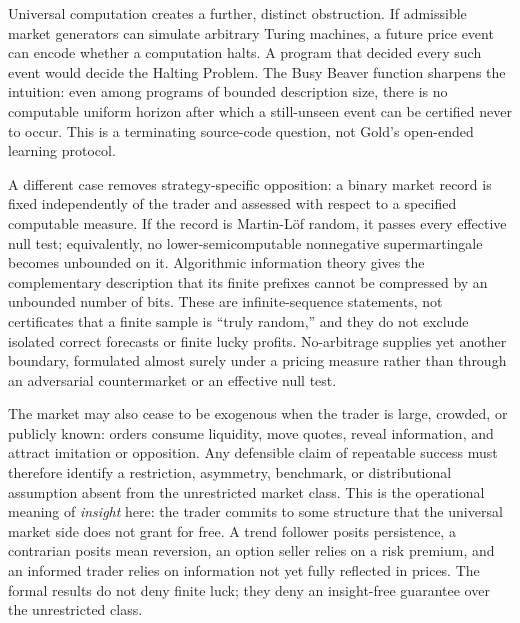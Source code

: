 \documentclass[aps,pra,reprint,superscriptaddress,amsmath,amssymb,floatfix]{revtex4-2}
\theoremstyle{plain}
\theoremstyle{definition}
\theoremstyle{remark}
\begin{document}
Universal computation creates a further, distinct obstruction. If admissible
market generators can simulate arbitrary Turing machines, a future price event
can encode whether a computation halts. A program that decided every such
event would decide the Halting Problem. The Busy Beaver function sharpens the
intuition: even among programs of bounded description size, there is no
computable uniform horizon after which a still-unseen event can be certified
never to occur. This is a terminating source-code question, not Gold's
open-ended learning protocol.

A different case removes strategy-specific opposition: a binary market record
is fixed independently of the trader and assessed with respect to a specified
computable measure. If the record is Martin-L\"of random, it passes every
effective null test; equivalently, no lower-semicomputable nonnegative
supermartingale becomes unbounded on it. Algorithmic information theory gives
the complementary description that its finite prefixes cannot be compressed
by an unbounded number of bits. These are infinite-sequence statements, not
certificates that a finite sample is ``truly random,'' and they do not exclude
isolated correct forecasts or finite lucky profits. No-arbitrage supplies yet
another boundary, formulated almost surely under a pricing measure rather than
through an adversarial countermarket or an effective null test.

The market may also cease to be exogenous when the trader is large, crowded,
or publicly known: orders consume liquidity, move quotes, reveal information,
and attract imitation or opposition. Any defensible claim of repeatable
success must therefore identify a restriction, asymmetry, benchmark, or
distributional assumption absent from the unrestricted market class. This is
the operational meaning of \emph{insight} here: the trader commits to some
structure that the universal market side does not grant for free. A trend
follower posits persistence, a contrarian posits mean reversion, an option
seller relies on a risk premium, and an informed trader relies on information
not yet fully reflected in prices. The formal results do not deny finite luck;
they deny an insight-free guarantee over the unrestricted class.
\end{document}
